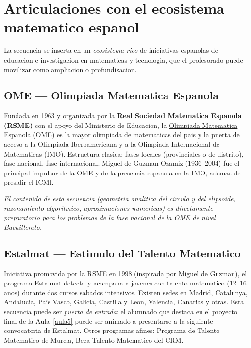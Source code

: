 \documentclass[12pt,a4paper]{scrartcl}
\newcommand{\acc}[1]{\textcolor{accent}{\textbf{#1}}}
\begin{document}
\section{Articulaciones con el ecosistema matematico espanol}\label{sec:ome}

La secuencia se inserta en un \emph{ecosistema rico} de iniciativas espanolas de educacion e investigacion en matematicas y tecnologia, que el profesorado puede movilizar como ampliacion o profundizacion.

\subsection{OME --- Olimpiada Matematica Espanola}

Fundada en 1963 y organizada por la \acc{Real Sociedad Matematica Espanola (RSME)} con el apoyo del Ministerio de Educacion, la \href{https://www.olimpiadamatematica.es/}{Olimpiada Matematica Espanola (OME)} es la mayor olimpiada de matematicas del pais y la puerta de acceso a la Olimpiada Iberoamericana y a la Olimpiada Internacional de Matematicas (IMO). Estructura clasica: fases locales (provinciales o de distrito), fase nacional, fase internacional. Miguel de Guzman Ozamiz (1936--2004) fue el principal impulsor de la OME y de la presencia espanola en la IMO, ademas de presidir el ICMI.

\emph{El contenido de esta secuencia (geometria analitica del circulo y del elipsoide, razonamiento algoritmico, aproximaciones numericas) es directamente preparatorio para los problemas de la fase nacional de la OME de nivel Bachillerato.}

\subsection{Estalmat --- Estimulo del Talento Matematico}

Iniciativa promovida por la RSME en 1998 (inspirada por Miguel de Guzman), el programa \href{https://www.estalmat.org/}{Estalmat} detecta y acompana a jovenes con talento matematico (12--16 anos) durante dos cursos sabados intensivos. Existen sedes en Madrid, Catalunya, Andalucia, Pais Vasco, Galicia, Castilla y Leon, Valencia, Canarias y otras. Esta secuencia puede ser \emph{puerta de entrada}: el alumnado que destaca en el proyecto final de la Aula~\ref{aula5} puede ser animado a presentarse a la siguiente convocatoria de Estalmat. Otros programas afines: Programa de Talento Matematico de Murcia, Beca Talento Matematico del CRM.
\end{document}
